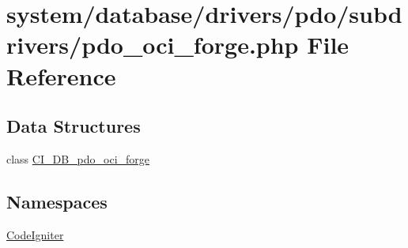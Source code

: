 \hypertarget{pdo__oci__forge_8php}{}\section{system/database/drivers/pdo/subdrivers/pdo\+\_\+oci\+\_\+forge.php File Reference}
\label{pdo__oci__forge_8php}
\subsection*{Data Structures}
\begin{DoxyCompactItemize}
\item 
class \mbox{\hyperlink{class_c_i___d_b__pdo__oci__forge}{C\+I\+\_\+\+D\+B\+\_\+pdo\+\_\+oci\+\_\+forge}}
\end{DoxyCompactItemize}
\subsection*{Namespaces}
\begin{DoxyCompactItemize}
\item 
 \mbox{\hyperlink{namespace_code_igniter}{Code\+Igniter}}
\end{DoxyCompactItemize}
